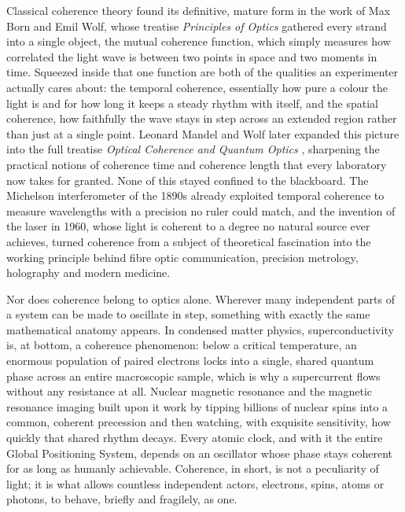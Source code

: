 	Classical coherence theory found its definitive, mature form in the work of Max Born and
	Emil Wolf, whose treatise \textit{Principles of Optics} \cite{born1999principles} gathered
	every strand into a single object, the mutual coherence function, which simply measures
	how correlated the light wave is between two points in space and two moments in time.
	Squeezed inside that one function are both of the qualities an experimenter actually
	cares about: the temporal coherence, essentially how pure a colour the light is and for
	how long it keeps a steady rhythm with itself, and the spatial coherence, how faithfully
	the wave stays in step across an extended region rather than just at a single point.
	Leonard Mandel and Wolf later expanded this picture into the full treatise
	\textit{Optical Coherence and Quantum Optics} \cite{mandel1995optical}, sharpening the
	practical notions of coherence time and coherence length that every laboratory now takes
	for granted. None of this stayed confined to the blackboard. The Michelson interferometer
	of the 1890s already exploited temporal coherence to measure wavelengths with a precision
	no ruler could match, and the invention of the laser in 1960, whose light is coherent to
	a degree no natural source ever achieves, turned coherence from a subject of theoretical
	fascination into the working principle behind fibre optic communication, precision
	metrology, holography and modern medicine.

	Nor does coherence belong to optics alone. Wherever many independent parts of a system
	can be made to oscillate in step, something with exactly the same mathematical anatomy
	appears. In condensed matter physics, superconductivity is, at bottom, a coherence
	phenomenon: below a critical temperature, an enormous population of paired electrons
	locks into a single, shared quantum phase across an entire macroscopic sample, which is
	why a supercurrent flows without any resistance at all. Nuclear magnetic resonance and
	the magnetic resonance imaging built upon it work by tipping billions of nuclear spins
	into a common, coherent precession and then watching, with exquisite sensitivity, how
	quickly that shared rhythm decays. Every atomic clock, and with it the entire Global
	Positioning System, depends on an oscillator whose phase stays coherent for as long as
	humanly achievable. Coherence, in short, is not a peculiarity of light; it is what allows
	countless independent actors, electrons, spins, atoms or photons, to behave, briefly and
	fragilely, as one.

